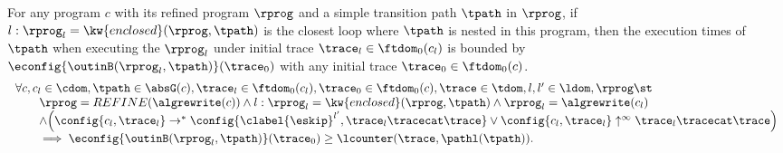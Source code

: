 \begin{lemma}
  \label{lem:pathlocalrb-sound}
  For any program $c$ with its refined program $\rprog$ and a simple transition path $\tpath$ in $\rprog$,
  if $l: \rprog_l = \kw{enclosed}(\rprog, \tpath)$ is the closest loop where $\tpath$ is nested in this program,
  then the execution times of $\tpath$ when executing the $\rprog_l$ under initial trace $\trace_l \in \ftdom_0(c_l)$ is bounded by $\econfig{\outinB(\rprog_l, \tpath)}(\trace_0)$ with any initial trace $\trace_0 \in \ftdom_0(c)$.
  \[
    \begin{array}{l}
    \forall c, c_l \in \cdom, \tpath \in \absG(c), 
    \trace_l \in \ftdom_0(c_l), \trace_0 \in \ftdom_0(c), \trace \in \tdom, l, l' \in \ldom, \rprog \st 
    \\ \qquad
    \rprog = REFINE(\algrewrite(c))
    \land
    l: \rprog_l = \kw{enclosed}(\rprog, \tpath)
    \land 
    \rprog_l = \algrewrite(c_l)
    \\ \qquad
    \land
    \Big(
    \config{c_l, \trace_l} \rightarrow^* \config{\clabel{\eskip}^{l'}, \trace_l \tracecat \trace}
    \lor \config{c_l, \trace_l} \uparrow^{\infty} \trace_l \tracecat \trace 
    \Big)
    \\ \qquad
    \implies
    \econfig{\outinB(\rprog_l, \tpath)}(\trace_0) \geq \lcounter(\trace, \pathl(\tpath)).
    \end{array}
  \]  
\end{lemma}
